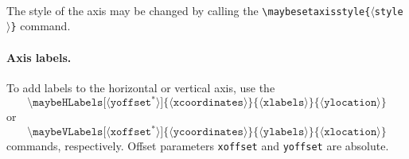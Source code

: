 \documentclass{article}
\newcommand{\command}[1]{\texttt{\textbackslash #1}}
\newcommand{\param}[1]{$\langle${#1}$\rangle$}
\newcommand{\Absolute}{${}^*$}
\begin{document}
\begin{center}
    \\
\end{center}

The style of the axis may be changed by calling the \command{maybesetaxisstyle\{\param{style}\}} command.
\begin{center}
\end{center}

\paragraph*{Axis labels.}
To add labels to the horizontal or vertical axis, use the
\[
    \command{maybeHLabels[\param{yoffset\Absolute}]\{\param{xcoordinates}\}\{\param{xlabels}\}\{\param{ylocation}\}}
\]
or
\[
    \command{maybeVLabels[\param{xoffset\Absolute}]\{\param{ycoordinates}\}\{\param{ylabels}\}\{\param{xlocation}\}}
\]
commands, respectively.
Offset parameters \texttt{xoffset} and \texttt{yoffset} are absolute.
\begin{center}
    \\
\end{center}
\end{document}
